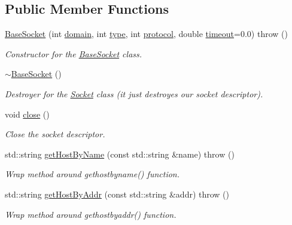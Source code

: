 \subsection*{Public Member Functions}
\begin{CompactItemize}
\item 
\hyperlink{classusock_1_1BaseSocket_5cf4bfad30ea514f522101899592b97f}{BaseSocket} (int \hyperlink{classusock_1_1BaseSocket_a51cae0b366638a5f697f64174135d90}{domain}, int \hyperlink{classusock_1_1BaseSocket_8117d25c7b482eb594d68137868ce5f9}{type}, int \hyperlink{classusock_1_1BaseSocket_09208675b41c416fb402824742963eaa}{protocol}, double \hyperlink{classusock_1_1BaseSocket_b419e8fd0b849c74b73a02d6bd9081e3}{timeout}=0.0)  throw ()
\begin{CompactList}\small\item\em Constructor for the \hyperlink{classusock_1_1BaseSocket}{BaseSocket} class. \item\end{CompactList}\item 
\hyperlink{classusock_1_1BaseSocket_60ad362afb927b4d4e7233c5e9735c7b}{$\sim$BaseSocket} ()
\begin{CompactList}\small\item\em Destroyer for the \hyperlink{classusock_1_1Socket}{Socket} class (it just destroyes our socket descriptor). \item\end{CompactList}\item 
void \hyperlink{classusock_1_1BaseSocket_06383c7ad352244fb0e5e6276e5e86c2}{close} ()
\begin{CompactList}\small\item\em Close the socket descriptor. \item\end{CompactList}\item 
std::string \hyperlink{classusock_1_1BaseSocket_7ffc3a11be4a9d7ba72a1f66f3dbad68}{getHostByName} (const std::string \&name)  throw ()
\begin{CompactList}\small\item\em Wrap method around gethostbyname() function. \item\end{CompactList}\item 
std::string \hyperlink{classusock_1_1BaseSocket_b0fdf738e659b1d7088611bd4b4c9b67}{getHostByAddr} (const std::string \&addr)  throw ()
\begin{CompactList}\small\item\em Wrap method around gethostbyaddr() function. \item\end{CompactList}\item 

\end{CompactItemize}

